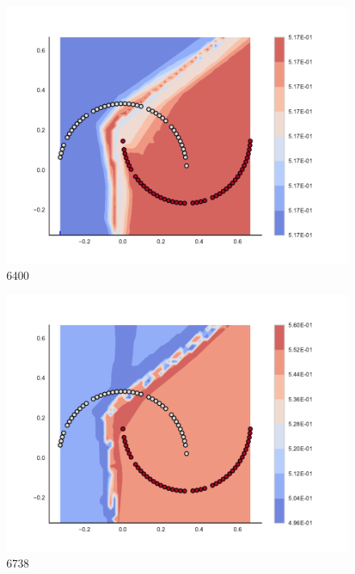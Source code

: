 \begin{subfigure}[b]{0.09\textwidth}
    \includegraphics[clip, trim=2.35cm 1.75cm 4.5cm 0cm,width=\textwidth]{img/convergence/6400.pdf}
    \caption{6400}
    \label{fig:convergence_6400}
\end{subfigure}
%
\begin{subfigure}[b]{0.09\textwidth}
    \includegraphics[clip, trim=2.35cm 1.75cm 4.5cm 0cm,width=\textwidth]{img/convergence/6738.pdf}
    \caption{6738}
    \label{fig:convergence_6738}
\end{subfigure}
%
